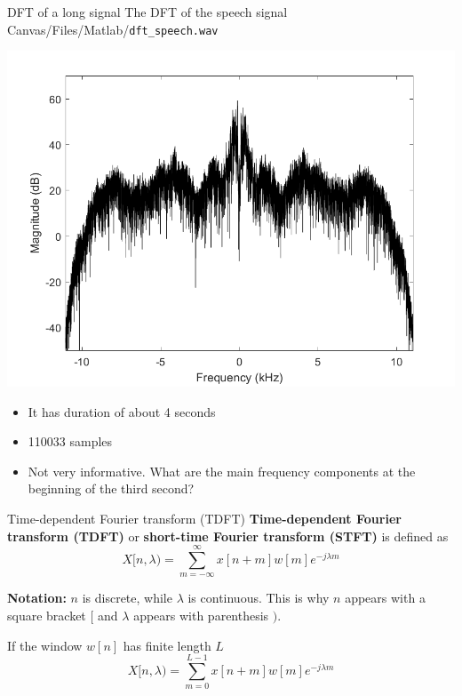 \documentclass[10pt]{beamer}
\begin{document}
%
\begin{frame}{DFT of a long signal}
	The DFT of the speech signal Canvas/Files/Matlab/\texttt{dft\_speech.wav}
	
	\begin{center}
		\includegraphics[scale=0.5]{figs/speech_dft_spectrum.png}
	\end{center}
	
	\begin{itemize}
		\item It has duration of about 4 seconds
		\item 110033 samples
		\item Not very informative. What are the main frequency components at the beginning of the third second?
	\end{itemize}
\end{frame}

%
\begin{frame}{Time-dependent Fourier transform (TDFT)}
\textbf{Time-dependent Fourier transform (TDFT)} or \textbf{short-time Fourier transform (STFT)} is defined as
\begin{equation*}
	X[n, \lambda) = \sum_{m = -\infty}^{\infty}x[n+m]w[m]e^{-j\lambda m}
\end{equation*}

\textbf{Notation:} $n$ is discrete, while $\lambda$ is continuous. This is why $n$ appears with a square bracket $[$ and $\lambda$ appears with parenthesis $)$.
\vspace{0.25cm}

If the window $w[n]$ has finite length $L$
\begin{equation*}
X[n, \lambda) = \sum_{m = 0}^{L-1}x[n+m]w[m]e^{-j\lambda m}
\end{equation*}

\end{frame}
\end{document}
